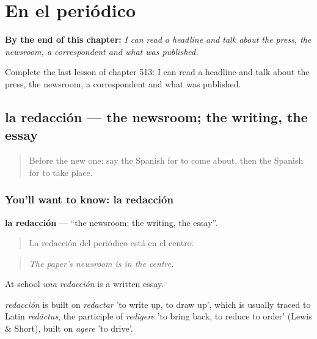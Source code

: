 
\chapter{En el periódico}
\label{ch:es-en-el-periodico}

\begin{chapteropening}
\textbf{By the end of this chapter:} \emph{I can read a headline and talk about the press, the newsroom, a correspondent and what was published.}

Complete the last lesson of chapter 513: I can read a headline and talk about the press, the newsroom, a correspondent and what was published.
\end{chapteropening}

\section[la redacción]{la redacción — the newsroom; the writing, the essay}

\label{lesson:ES-C513-redaccion}



\begin{quote}
Before the new one: say the Spanish for to come about, then the Spanish for to take place.
\end{quote}

\subsection*{You'll want to know: la redacción}
\textbf{la redacción} — \textquotedblleft{}the newsroom; the writing, the essay\textquotedblright{}.

\begin{quote}
La redacción del periódico está en el centro.
\end{quote}

\begin{quote}
\emph{The paper's newsroom is in the centre.}
\end{quote}

At school \emph{una redacción} is a written essay.

\begin{cousinweb}
\emph{redacción} is built on \emph{redactar} 'to write up, to draw up', which is usually traced to Latin \emph{redāctus}, the participle of \emph{redigere} 'to bring back, to reduce to order' (Lewis \& Short), built on \emph{agere} 'to drive'.
\end{cousinweb}

